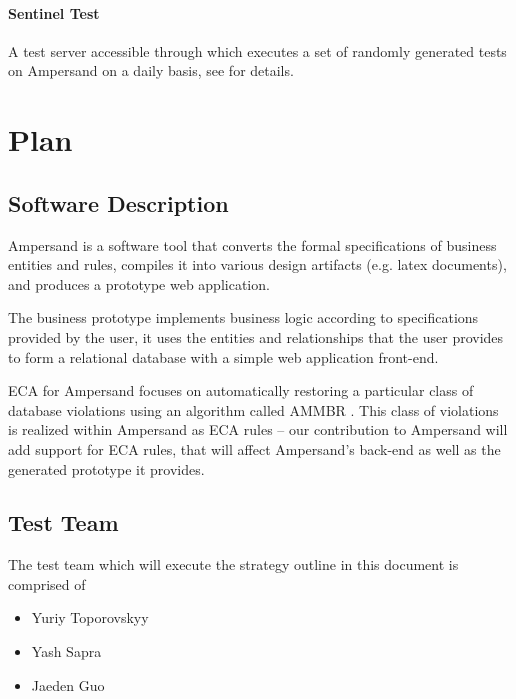 \documentclass[12pt]{report}
\begin{document}
 \subsubsection*{Sentinel Test}
A test server accessible through \cite{sentinellink} which executes a set of 
randomly generated tests on Ampersand on a daily basis, see \cite{sentinel} for details.

%
%

\chapter{Plan}\label{ch:Plan}

\section{Software Description}\label{sec:SoftwareDesc}
Ampersand is a software tool that converts the formal specifications of 
business entities and rules, compiles it into various design artifacts (e.g. 
latex documents), and produces a prototype web application.

The business prototype implements business logic according to specifications 
provided by the user, it uses the entities and relationships that the user 
provides to form a relational database with a simple web application front-end.

ECA for Ampersand focuses on automatically restoring a particular class of 
database violations using an algorithm called AMMBR \cite{amber}.  This class 
of violations is realized within Ampersand as ECA rules -- our contribution to 
Ampersand will add support for ECA rules, that will affect Ampersand's back-end 
as well as the generated prototype it provides.

\section{Test Team}\label{sec:TestTeam} 

The test team which will execute the strategy outline in this document is comprised of
\begin{itemize}
\item Yuriy Toporovskyy  
\item Yash Sapra        
\item Jaeden Guo         
\end{itemize}
\end{document}
